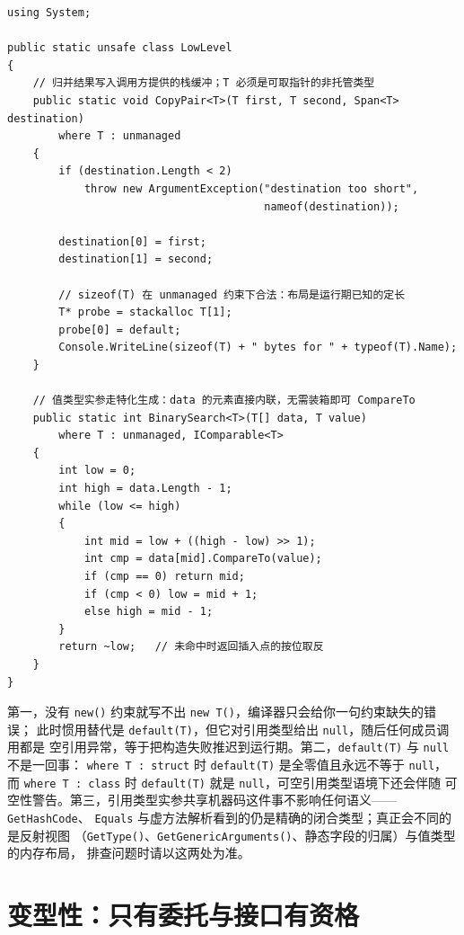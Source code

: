 \documentclass[12pt,a4paper,fontset=fandol]{ctexbook}
\newcommand{\kw}[1]{\texttt{#1}}
\begin{document}
\begin{lstlisting}[style=csharpstyle,caption={零装箱的二分查找与按 sizeof 计算的定长缓冲}]
using System;

public static unsafe class LowLevel
{
    // 归并结果写入调用方提供的栈缓冲；T 必须是可取指针的非托管类型
    public static void CopyPair<T>(T first, T second, Span<T> destination)
        where T : unmanaged
    {
        if (destination.Length < 2)
            throw new ArgumentException("destination too short",
                                        nameof(destination));

        destination[0] = first;
        destination[1] = second;

        // sizeof(T) 在 unmanaged 约束下合法：布局是运行期已知的定长
        T* probe = stackalloc T[1];
        probe[0] = default;
        Console.WriteLine(sizeof(T) + " bytes for " + typeof(T).Name);
    }

    // 值类型实参走特化生成：data 的元素直接内联，无需装箱即可 CompareTo
    public static int BinarySearch<T>(T[] data, T value)
        where T : unmanaged, IComparable<T>
    {
        int low = 0;
        int high = data.Length - 1;
        while (low <= high)
        {
            int mid = low + ((high - low) >> 1);
            int cmp = data[mid].CompareTo(value);
            if (cmp == 0) return mid;
            if (cmp < 0) low = mid + 1;
            else high = mid - 1;
        }
        return ~low;   // 未命中时返回插入点的按位取反
    }
}
\end{lstlisting}

\begin{warning}[title={构造、默认值与空值引用三处易错}]
第一，没有 \kw{new()} 约束就写不出 \kw{new T()}，编译器只会给你一句约束缺失的错误；
此时惯用替代是 \kw{default(T)}，但它对引用类型给出 \kw{null}，随后任何成员调用都是
空引用异常，等于把构造失败推迟到运行期。第二，\kw{default(T)} 与 \kw{null} 不是一回事：
\kw{where T : struct} 时 \kw{default(T)} 是全零值且永远不等于 \kw{null}，而
\kw{where T : class} 时 \kw{default(T)} 就是 \kw{null}，可空引用类型语境下还会伴随
可空性警告。第三，引用类型实参共享机器码这件事不影响任何语义——\kw{GetHashCode}、
\kw{Equals} 与虚方法解析看到的仍是精确的闭合类型；真正会不同的是反射视图
（\kw{GetType()}、\kw{GetGenericArguments()}、静态字段的归属）与值类型的内存布局，
排查问题时请以这两处为准。
\end{warning}

\section{变型性：只有委托与接口有资格}
\end{document}
